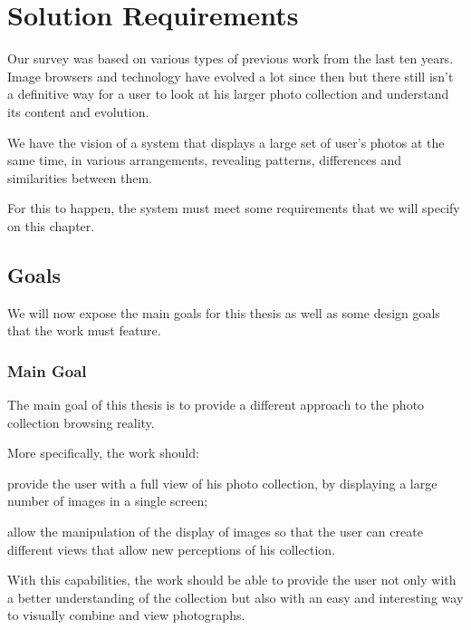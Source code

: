 \chapter{Solution Requirements} %
\label{chapter:solution_requirements}

Our survey was based on various types of previous work from the last ten years. Image browsers and technology have evolved a lot since then but there still isn't a definitive way for a user to look at his larger photo collection and understand its content and evolution.

We have the vision of a system that displays a large set of user’s photos at the same time, in various arrangements, revealing patterns, differences and similarities between them.

For this to happen, the system must meet some requirements that we will specify on this chapter.


\section{Goals} %
\label{sec:goals}

We will now expose the main goals for this thesis as well as some design goals that the work must feature.

\subsection{Main Goal} %
\label{sub:main_goal}

The main goal of this thesis is to provide a different approach to the photo collection browsing reality.

More specifically, the work should:

\begin{myitemize}
	\item{provide the user with a full view of his photo collection, by displaying a large number of images in a single screen;}
	\item{allow the manipulation of the display of images so that the user can create different views that allow new perceptions of his collection.}
\end{myitemize}

With this capabilities, the work should be able to provide the user not only with a better understanding of the collection but also with an easy and interesting way to visually combine and view photographs.



